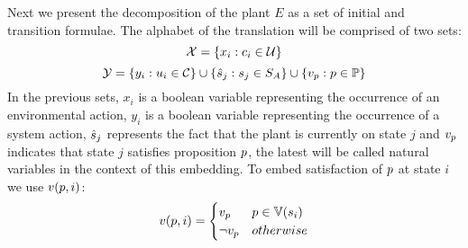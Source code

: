 %
Next we present the decomposition of the plant $E$ as a set of initial and transition formulae.
The alphabet of the translation will be comprised of two sets:
\[{\mathcal{X}} = \{x_i : c_i \in {\mathcal{U}} \}\]
\[{\mathcal{Y}} = \{y_i : u_i \in {\mathcal{C}} \} \cup \{\hat{s}_{j} : s_j \in S_A \} \cup \{v_{{p}} : {p} \in {\mathbb{P}}\}\]
In the previous sets, $x_i$ is a boolean variable representing the occurrence of an environmental action, $y_i$ is a boolean variable representing the occurrence of a system action, $\hat{s}_{j}$ represents the fact that the plant is currently on state $j$ and $v_{{p}}$ indicates that state $j$ satisfies proposition ${p}$, the latest will be called natural variables in the context of this embedding.
To embed satisfaction of ${p}$ at state $i$ we use $v({p},i)$:
\[
v({p},i) = \begin{cases}
v_{{p}} & {p} \in {\mathbb{V}}(s_i) \\
\neg v_{{p}} & otherwise
\end{cases}
\]

